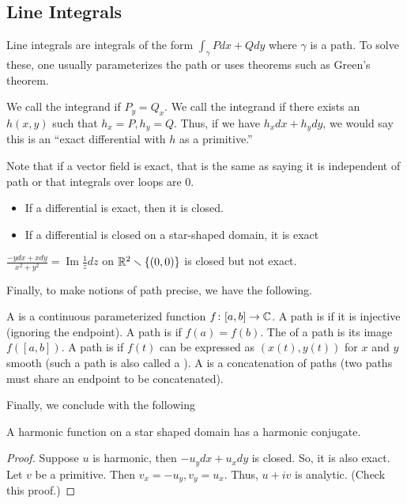 \documentclass[11pt,leqno,oneside]{amsart}
\numberwithin{thm}{section}
\renewcommand{\Im}{\operatorname{Im}}
\begin{document}
  \subsection{Line Integrals}
  Line integrals are integrals of the form $\int_\gamma Pdx + Qdy$ where
  $\gamma$ is a path. To solve these, one usually parameterizes the path or uses
  theorems such as Green's theorem.
  \begin{defn}
    We call the integrand  if $P_y = Q_x$. We call the integrand
     if there exists an $h(x,y)$ such that $h_x = P, h_y = Q$. Thus,
    if we have $h_xdx+h_ydy$, we would say this is an ``exact differential with
    $h$ as a primitive.''
  \end{defn}
  Note that if a vector field is exact, that is the same as saying it is
  independent of path or that integrals over loops are 0.
  \begin{rmk}
    \begin{itemize}
    \item If a differential is exact, then it is closed.
    \item If a differential is closed on a star-shaped domain, it is exact
    \end{itemize}
  \end{rmk}
  \begin{example}
    $\frac{-ydx+xdy}{x^2+y^2} = \Im \frac{1}{z}dz$ on ${\mathbb R}^2 \smallsetminus
    \{(0,0)\}$ is closed but not exact.
  \end{example}
  Finally, to make notions of path precise, we have the following.
\begin{defn}
    A  is a continuous parameterized function $f\colon[a,b] \to {\mathbb C}$.  A
    path is  if it is injective (ignoring the endpoint).  A path is
     if $f(a) = f(b)$.  The  of a path is its image
    $f([a,b])$.  A path is  if $f(t)$ can be expressed as $(x(t),
    y(t))$ for $x$ and $y$ smooth (such a path is also called a ).
    A  is a concatenation of paths (two paths must share an
    endpoint to be concatenated).
  \end{defn}

  Finally, we conclude with the following
  \begin{thm}
    A harmonic function on a star shaped domain has a harmonic conjugate.
  \end{thm}
  \begin{proof}
    Suppose $u$ is harmonic, then $-u_ydx+u_xdy$ is closed. So, it is also
    exact. Let $v$ be a primitive. Then $v_x = -u_y, v_y=u_x$. Thus, $u+iv$ is
    analytic. (Check this proof.)
  \end{proof}
\end{document}
